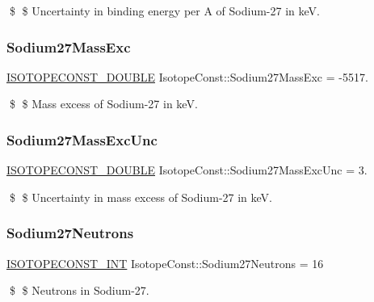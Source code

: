 \$ \$ Uncertainty in binding energy per A of Sodium-\/27 in keV. \mbox{\label{group___isotope_const-_sodium-_na27_ga98ee16cf460b37dc1f0cff7bd0409fcc}} 
\subsubsection{\texorpdfstring{Sodium27\+Mass\+Exc}{Sodium27MassExc}}
{\footnotesize\ttfamily \mbox{\hyperlink{group___isotope_const-_macros_ga8f45a7272ce02c0b4c65c44636ed719a}{I\+S\+O\+T\+O\+P\+E\+C\+O\+N\+S\+T\+\_\+\+D\+O\+U\+B\+LE}} Isotope\+Const\+::\+Sodium27\+Mass\+Exc = -\/5517.}

\$ \$ Mass excess of Sodium-\/27 in keV. \mbox{\label{group___isotope_const-_sodium-_na27_ga5ce5f7235e1c844a384bce37085e4eda}} 
\subsubsection{\texorpdfstring{Sodium27\+Mass\+Exc\+Unc}{Sodium27MassExcUnc}}
{\footnotesize\ttfamily \mbox{\hyperlink{group___isotope_const-_macros_ga8f45a7272ce02c0b4c65c44636ed719a}{I\+S\+O\+T\+O\+P\+E\+C\+O\+N\+S\+T\+\_\+\+D\+O\+U\+B\+LE}} Isotope\+Const\+::\+Sodium27\+Mass\+Exc\+Unc = 3.}

\$ \$ Uncertainty in mass excess of Sodium-\/27 in keV. \mbox{\label{group___isotope_const-_sodium-_na27_ga9d80aa2d62c59ccd7d5d3584db1d9fa7}} 
\subsubsection{\texorpdfstring{Sodium27\+Neutrons}{Sodium27Neutrons}}
{\footnotesize\ttfamily \mbox{\hyperlink{group___isotope_const-_macros_ga5f18360b3e99483a35c32d789e62621c}{I\+S\+O\+T\+O\+P\+E\+C\+O\+N\+S\+T\+\_\+\+I\+NT}} Isotope\+Const\+::\+Sodium27\+Neutrons = 16}

\$ \$ Neutrons in Sodium-\/27. \mbox{\label{group___isotope_const-_sodium-_na27_gaee5186ad06cb32cf632a21e8db9a385e}} 
